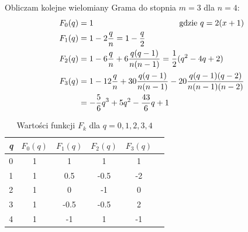 \documentclass{article}
\begin{document}
\noindent
Obliczam kolejne wielomiany Grama do stopnia \(m = 3\) dla \(n = 4\):
\begin{align*}
    F_0(q) &= 1 \hspace{37mm} \text{gdzie } q = 2(x + 1)\\
    F_1(q) &= 1 - 2\frac{q}{n} = 1 - \frac{q}{2}\\
    F_2(q) &= 1 - 6\frac{q}{n} + 6\frac{q(q-1)}{n(n-1)} = \frac{1}{2}(q^2 - 4q + 2)\\
    F_3(q) &= 1 - 12\frac{q}{n} + 30\frac{q(q-1)}{n(n-1)} - 20\frac{q(q-1)(q-2)}{n(n-1)(n-2)}\\
    &= -\frac{5}{6}q^3 + 5q^2 - \frac{43}{6}q + 1
\end{align*}
\begin{table}[h]
    \centering
    \begin{tabular}{c|c|c|c|c|c}
        \textit{q} & \(F_0(q)\) & \(F_1(q)\) & \(F_2(q)\) & \(F_3(q)\)\\
        \hline
        0 & 1 & 1 & 1 & 1\\
        1 & 1 & 0.5 & -0.5 & -2\\
        2 & 1 & 0 & -1 & 0\\
        3 & 1 & -0.5 & -0.5 & 2\\
        4 & 1 & -1 & 1 & -1
    \end{tabular}
    \caption{Wartości funkcji \(F_k\) dla \(q = 0, 1, 2, 3, 4\)}
    \label{tab:table2}
\end{table}
\end{document}
